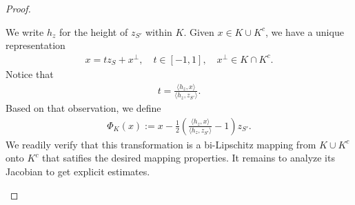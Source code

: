 \documentclass[10pt,letterpaper]{article}
\begin{document}
\begin{proof}
\begin{itemize}
        We write $h_{z}$ for the height of $z_{S'}$ within $K$.
        Given $x \in K \cup K^{c}$, we have a unique representation
        \begin{align*}
            x = t z_{S} + x^{\perp}, \quad t \in [-1,1], \quad x^{\perp} \in K \cap K^{c}.
        \end{align*}
        Notice that 
        \begin{align*}
            t = \frac{\langle h_{z},x\rangle}{\langle h_{z},z_{S'}\rangle} 
            .
        \end{align*}
        Based on that observation, we define 
        \begin{align*}
            \Phi_{K}(x) := x - \frac 1 2 \left( \frac{\langle h_{z},x\rangle}{\langle h_{z},z_{S'}\rangle} - 1 \right) z_{S'}
            .
        \end{align*}
        We readily verify that this transformation is a bi-Lipschitz mapping from $K \cup K^{c}$ onto $K^{c}$
        that satifies the desired mapping properties. 
        It remains to analyze its Jacobian to get explicit estimates. 
        

\end{itemize}
\end{proof}
\end{document}
